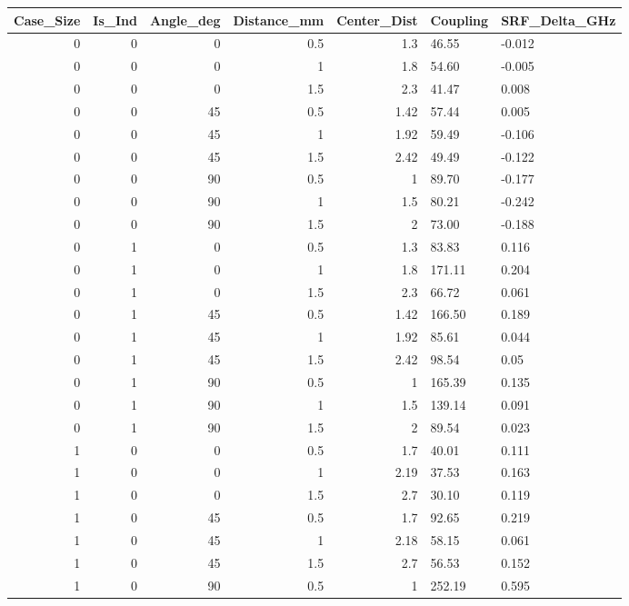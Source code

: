 \documentclass[12pt]{usfcoe}
\begin{document}
    \begin{table}
    \centering
        \begin{tabular}{|r|r|r|r|r|l|l|}%
        
        \hline
        Case\_Size&Is\_Ind&Angle\_deg&Distance\_mm&Center\_Dist&Coupling&SRF\_Delta\_GHz \\
        \hline
        0&0&0&0.5&1.3&46.55&-0.012 \\
        \hline
        0&0&0&1&1.8&54.60&-0.005 \\
        \hline
        0&0&0&1.5&2.3&41.47&0.008 \\
        \hline
        0&0&45&0.5&1.42&57.44&0.005 \\
        \hline
        0&0&45&1&1.92&59.49&-0.106 \\
        \hline
        0&0&45&1.5&2.42&49.49&-0.122 \\
        \hline
        0&0&90&0.5&1&89.70&-0.177 \\
        \hline
        0&0&90&1&1.5&80.21&-0.242 \\
        \hline
        0&0&90&1.5&2&73.00&-0.188 \\
        \hline
        0&1&0&0.5&1.3&83.83&0.116 \\
        \hline
        0&1&0&1&1.8&171.11&0.204 \\
        \hline
        0&1&0&1.5&2.3&66.72&0.061 \\
        \hline
        0&1&45&0.5&1.42&166.50&0.189 \\
        \hline
        0&1&45&1&1.92&85.61&0.044 \\
        \hline
        0&1&45&1.5&2.42&98.54&0.05 \\
        \hline
        0&1&90&0.5&1&165.39&0.135 \\
        \hline
        0&1&90&1&1.5&139.14&0.091 \\
        \hline
        0&1&90&1.5&2&89.54&0.023 \\
        \hline
        1&0&0&0.5&1.7&40.01&0.111 \\
        \hline
        1&0&0&1&2.19&37.53&0.163 \\
        \hline
        1&0&0&1.5&2.7&30.10&0.119 \\
        \hline
        1&0&45&0.5&1.7&92.65&0.219 \\
        \hline
        1&0&45&1&2.18&58.15&0.061 \\
        \hline
        1&0&45&1.5&2.7&56.53&0.152 \\
        \hline
        1&0&90&0.5&1&252.19&0.595 \\

\end{tabular}
\end{table}
\end{document}
